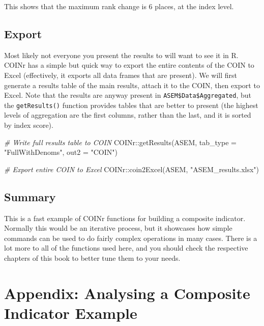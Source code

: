 \documentclass[
]{book}
\newenvironment{Shaded}{\begin{snugshade}}{\end{snugshade}}
\newcommand{\AttributeTok}[1]{\textcolor[rgb]{0.77,0.63,0.00}{#1}}
\newcommand{\CommentTok}[1]{\textcolor[rgb]{0.56,0.35,0.01}{\textit{#1}}}
\newcommand{\FunctionTok}[1]{\textcolor[rgb]{0.00,0.00,0.00}{#1}}
\newcommand{\NormalTok}[1]{#1}
\newcommand{\SpecialCharTok}[1]{\textcolor[rgb]{0.00,0.00,0.00}{#1}}
\newcommand{\StringTok}[1]{\textcolor[rgb]{0.31,0.60,0.02}{#1}}
\begin{document}
This shows that the maximum rank change is 6 places, at the index level.

\hypertarget{export}{%
\section{Export}\label{export}}

Most likely not everyone you present the results to will want to see it in R. COINr has a simple but quick way to export the entire contents of the COIN to Excel (effectively, it exports all data frames that are present). We will first generate a results table of the main results, attach it to the COIN, then export to Excel. Note that the results are anyway present in \texttt{ASEM\$Data\$Aggregated}, but the \texttt{getResults()} function provides tables that are better to present (the highest levels of aggregation are the first columns, rather than the last, and it is sorted by index score).

\begin{Shaded}
\begin{Highlighting}[]
\CommentTok{\# Write full results table to COIN}
\NormalTok{COINr}\SpecialCharTok{::}\FunctionTok{getResults}\NormalTok{(ASEM, }\AttributeTok{tab\_type =} \StringTok{"FullWithDenoms"}\NormalTok{, }\AttributeTok{out2 =} \StringTok{"COIN"}\NormalTok{)}

\CommentTok{\# Export entire COIN to Excel}
\NormalTok{COINr}\SpecialCharTok{::}\FunctionTok{coin2Excel}\NormalTok{(ASEM, }\StringTok{"ASEM\_results.xlsx"}\NormalTok{)}
\end{Highlighting}
\end{Shaded}

\hypertarget{summary}{%
\section{Summary}\label{summary}}

This is a fast example of COINr functions for building a composite indicator. Normally this would be an iterative process, but it showcases how simple commands can be used to do fairly complex operations in many cases. There is a lot more to all of the functions used here, and you should check the respective chapters of this book to better tune them to your needs.

\hypertarget{appendix-analysing-a-composite-indicator-example}{%
\chapter{Appendix: Analysing a Composite Indicator Example}\label{appendix-analysing-a-composite-indicator-example}}
\end{document}
